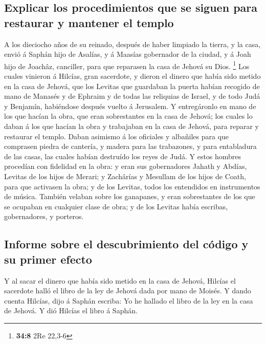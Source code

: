 \hypertarget{explicar-los-procedimientos-que-se-siguen-para-restaurar-y-mantener-el-templo}{%
\subsection{Explicar los procedimientos que se siguen para restaurar y
mantener el
templo}\label{explicar-los-procedimientos-que-se-siguen-para-restaurar-y-mantener-el-templo}}

 A los dieciocho años de su reinado, después de haber
limpiado la tierra, y la casa, envió á Saphán hijo de Asalías, y á
Maasías gobernador de la ciudad, y á Joah hijo de Joachâz, canciller,
para que reparasen la casa de Jehová su Dios. \footnote{\textbf{34:8}
  2Re 22,3-6}  Los cuales vinieron á Hilcías, gran
sacerdote, y dieron el dinero que había sido metido en la casa de
Jehová, que los Levitas que guardaban la puerta habían recogido de mano
de Manasés y de Ephraim y de todas las reliquias de Israel, y de todo
Judá y Benjamín, habiéndose después vuelto á Jerusalem.  Y
entregáronlo en mano de los que hacían la obra, que eran sobrestantes en
la casa de Jehová; los cuales lo daban á los que hacían la obra y
trabajaban en la casa de Jehová, para reparar y restaurar el templo.
 Daban asimismo á los oficiales y albañiles para que
comprasen piedra de cantería, y madera para las trabazones, y para
entabladura de las casas, las cuales habían destruído los reyes de Judá.
 Y estos hombres procedían con fidelidad en la obra: y eran
sus gobernadores Jahath y Abdías, Levitas de los hijos de Merari; y
Zachârías y Mesullam de los hijos de Coath, para que activasen la obra;
y de los Levitas, todos los entendidos en instrumentos de música.
 También velaban sobre los ganapanes, y eran sobrestantes
de los que se ocupaban en cualquier clase de obra; y de los Levitas
había escribas, gobernadores, y porteros.

\hypertarget{informe-sobre-el-descubrimiento-del-cuxf3digo-y-su-primer-efecto}{%
\subsection{Informe sobre el descubrimiento del código y su primer
efecto}\label{informe-sobre-el-descubrimiento-del-cuxf3digo-y-su-primer-efecto}}

 Y al sacar el dinero que había sido metido en la casa de
Jehová, Hilcías el sacerdote halló el libro de la ley de Jehová dada por
mano de Moisés.  Y dando cuenta Hilcías, dijo á Saphán
escriba: Yo he hallado el libro de la ley en la casa de Jehová. Y dió
Hilcías el libro á Saphán.

